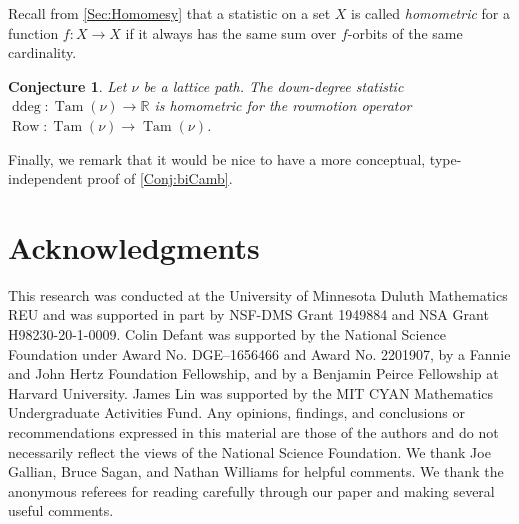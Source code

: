 \documentclass[11pt]{amsart}
\newtheorem{conjecture}[theorem]{Conjecture}
\theoremstyle{definition}
\DeclareMathOperator{\ddeg}{ddeg}
\DeclareMathOperator{\Tam}{Tam}
\DeclareMathOperator{\row}{Row}
\begin{document}
Recall from \cref{Sec:Homomesy} that a statistic on a set $X$ is called \emph{homometric} for a function $f\colon X\to X$ if it always has the same sum over $f$-orbits of the same cardinality. 

\begin{conjecture}
Let $\nu$ be a lattice path. The down-degree statistic $\ddeg\colon\Tam(\nu)\to\mathbb R$ is homometric for the rowmotion operator $\row\colon\Tam(\nu)\to\Tam(\nu)$.
\end{conjecture}

Finally, we remark that it would be nice to have a more conceptual, type-independent proof of \cref{Conj:biCamb}. 

\section*{Acknowledgments}
This research was conducted at the University of Minnesota Duluth Mathematics REU and was supported in part by NSF-DMS Grant 1949884 and NSA Grant H98230-20-1-0009. Colin Defant was supported by the National Science Foundation under Award
No. DGE–1656466 and Award No. 2201907, by a Fannie and John Hertz Foundation Fellowship,
and by a Benjamin Peirce Fellowship at Harvard University. James Lin was supported by the MIT CYAN Mathematics Undergraduate Activities Fund. Any opinions, findings, and conclusions or recommendations expressed in this material are those of the authors and do not necessarily reflect the views of the National Science Foundation. We thank Joe Gallian, Bruce Sagan, and Nathan Williams for helpful comments. We thank the anonymous referees for reading carefully through our paper and making several useful comments.  
\end{document}
